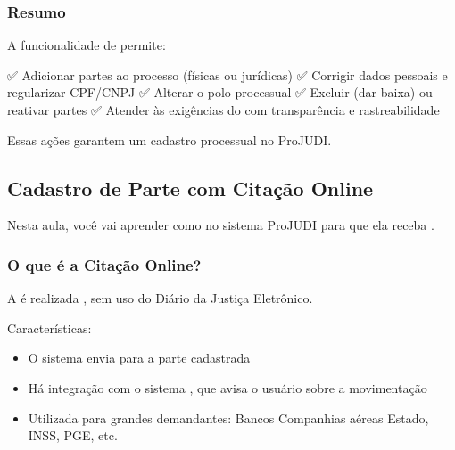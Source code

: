 \documentclass[letterpaper,10pt,brazil]{sphinxmanual}
\begin{document}
\subsubsection{Resumo}
\label{\detokenize{projud_23_cadastroparte:resumo}}
\sphinxAtStartPar
A funcionalidade de  permite:

\sphinxAtStartPar
✅ Adicionar partes ao processo (físicas ou jurídicas)
✅ Corrigir dados pessoais e regularizar CPF/CNPJ
✅ Alterar o polo processual
✅ Excluir (dar baixa) ou reativar partes
✅ Atender às exigências do  com transparência e rastreabilidade

\sphinxAtStartPar
Essas ações garantem um cadastro processual  no ProJUDI.

\sphinxstepscope


\subsection{Cadastro de Parte com Citação Online}
\label{\detokenize{projud_24_cadastropartecitacaoonline:cadastro-de-parte-com-citacao-online}}\label{\detokenize{projud_24_cadastropartecitacaoonline::doc}}
\sphinxAtStartPar
Nesta aula, você vai aprender como  no sistema ProJUDI para que ela receba .


\subsubsection{O que é a Citação Online?}
\label{\detokenize{projud_24_cadastropartecitacaoonline:o-que-e-a-citacao-online}}
\sphinxAtStartPar
A  é realizada , sem uso do Diário da Justiça Eletrônico.

\sphinxAtStartPar
Características:
\begin{itemize}
\item {} 
\sphinxAtStartPar
O sistema envia  para a parte cadastrada

\item {} 
\sphinxAtStartPar
Há integração com o sistema , que avisa o usuário sobre a movimentação

\item {} 
\sphinxAtStartPar
Utilizada para grandes demandantes:
\sphinxhyphen{} Bancos
\sphinxhyphen{} Companhias aéreas
\sphinxhyphen{} Estado, INSS, PGE, etc.

\end{itemize}
\end{document}
